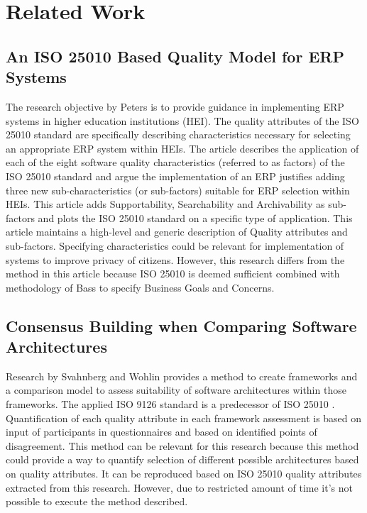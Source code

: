 \chapter{Related Work}\label{s:related}

\section{An ISO 25010 Based Quality Model for ERP Systems}
The research objective by Peters \etal \cite{Peters2020AnI2} is to provide guidance in implementing ERP systems in higher education institutions (HEI). The quality attributes of the ISO 25010 standard \cite{ISO:25010:2011} are specifically describing characteristics necessary for selecting an appropriate ERP system within HEIs. The article describes the application of each of the eight software quality characteristics (referred to as factors) of the ISO 25010 standard and argue the implementation of an ERP justifies adding three new sub-characteristics (or sub-factors) suitable for ERP selection within HEIs. This article adds Supportability, Searchability and Archivability as sub-factors and plots the ISO 25010 standard on a specific type of application. This article maintains a high-level and generic description of Quality attributes and sub-factors. Specifying characteristics could be relevant for implementation of systems to improve privacy of citizens. However, this research differs from the method in this article because ISO 25010 is deemed sufficient combined with methodology of Bass \etal \cite{Bass2015SoftwareAI} to specify Business Goals and Concerns. 

\section{Consensus Building when Comparing Software Architectures}
Research by Svahnberg and Wohlin \cite{Svahnberg2002ConsensusBW} provides a method to create frameworks and a comparison model to assess suitability of software architectures within those frameworks. The applied ISO 9126 standard \cite{ISO9126} is a predecessor of ISO 25010 \cite{ISO:25010:2011}. Quantification of each quality attribute in each framework assessment is based on input of participants in questionnaires and based on identified points of disagreement. This method can be relevant for this research because this method could provide a way to quantify selection of different possible architectures based on quality attributes. It can be reproduced based on ISO 25010 quality attributes extracted from this research. However, due to restricted amount of time it's not possible to execute the method described.

